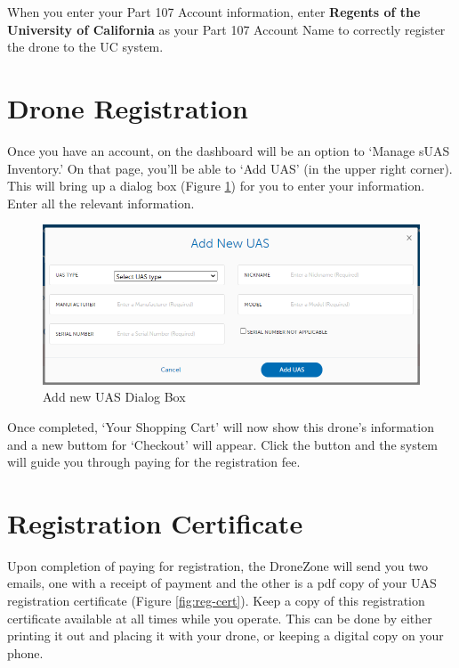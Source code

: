 \documentclass[
]{book}
\begin{document}
When you enter your Part 107 Account information, enter \textbf{Regents of the University of California} as your Part 107 Account Name to correctly register the drone to the UC system.

\hypertarget{drone-registration}{%
\section{Drone Registration}\label{drone-registration}}

Once you have an account, on the dashboard will be an option to `Manage sUAS Inventory.' On that page, you'll be able to `Add UAS' (in the upper right corner). This will bring up a dialog box (Figure \ref{fig:add-UAS}) for you to enter your information. Enter all the relevant information.

\begin{figure}

{\centering \includegraphics[width=0.8\linewidth]{images/Add_new_UAS} 

}

\caption{Add new UAS Dialog Box}\label{fig:add-UAS}
\end{figure}

Once completed, `Your Shopping Cart' will now show this drone's information and a new buttom for `Checkout' will appear. Click the button and the system will guide you through paying for the registration fee.

\hypertarget{registration-certificate}{%
\section{Registration Certificate}\label{registration-certificate}}

Upon completion of paying for registration, the DroneZone will send you two emails, one with a receipt of payment and the other is a pdf copy of your UAS registration certificate (Figure \ref{fig:reg-cert}). Keep a copy of this registration certificate available at all times while you operate. This can be done by either printing it out and placing it with your drone, or keeping a digital copy on your phone.
\end{document}
